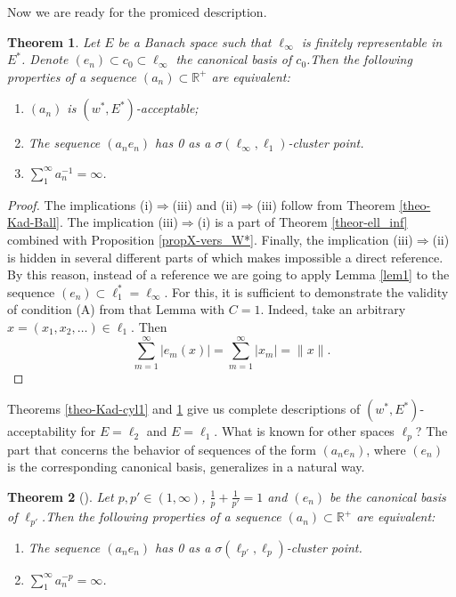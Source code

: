 \documentclass[11pt,twoside, reqno]{amsart}
\theoremstyle{plain}
\newtheorem{theorem}{Theorem}[section]
\theoremstyle{remark}
\theoremstyle{definition}
\numberwithin{equation}{section}
\begin{document}
Now we are ready for the promiced description.
\begin{theorem}  \label{theorE*=ell_inf}
Let $E$ be a Banach space such that $\ell_\infty$ is finitely
representable in $E^*$. Denote $(e_n) \subset c_0 \subset \ell_\infty$ the canonical basis of $c_0$.Then the following properties of a sequence $(a_n) \subset {\mathbb{R}}^+$ are equivalent:

\begin{enumerate}
\item[(i)] $(a_n)$ is $(w^*, E^*)$-acceptable;

\item[(ii)] The sequence $(a_n e_n)$ has 0 as a $\sigma(\ell_\infty, \ell_1)$-cluster point.

\item[(iii)] $\sum_1^\infty a_n^{-1}=\infty$.
\end{enumerate}
\end{theorem}

\begin{proof}
The implications (i)$\Longrightarrow$(iii) and (ii)$\Longrightarrow$(iii) follow from Theorem \ref{theo-Kad-Ball}. The implication (iii)$\Longrightarrow$(i) is a part of Theorem \ref{theor-ell_inf} combined with Proposition \ref{propX-vers_W*}. Finally, the implication (iii)$\Longrightarrow$(ii) is hidden in several different parts of \cite{Kad-cyl} which makes impossible a direct reference. By this reason, instead of a reference we are going to apply Lemma \ref{lem1} to the sequence  $(e_n) \subset \ell_1^* = \ell_\infty$. For this, it is sufficient to demonstrate the validity of condition (A) from that Lemma with $C=1$. Indeed, take an arbitrary $x=(x_1, x_2, \ldots) \in \ell_1$. Then
$$
\sum_{m=1}^\infty \left|e_m(x) \right| = \sum_{m=1}^\infty \left|x_m\right| = \|x\|.
$$
\end{proof}

Theorems \ref{theo-Kad-cyl1} and \ref{theorE*=ell_inf} give us complete descriptions of $(w^*, E^*)$-acceptability for $E = \ell_2$ and  $E = \ell_1$. What is known for other spaces $\ell_p$? The part that concerns the behavior of sequences of the form  $(a_n e_n)$, where  $(e_n)$ is the corresponding canonical basis, generalizes in a natural way.

\begin{theorem}[{\cite[Lemma 2.2]{Shkarin}}]  \label{theorE*=ell_p}
Let $p, p' \in (1, \infty)$, $\frac{1}{p}+\frac{1}{p'}=1$ and $(e_n)$ be the  canonical basis of $\ell_{p'}$.Then the following properties of a sequence $(a_n) \subset {\mathbb{R}}^+$ are equivalent:

\begin{enumerate}

\item[(A)] The sequence $(a_n e_n)$ has 0 as a $\sigma(\ell_{p'}, \ell_p)$-cluster point.

\item[(B)] $\sum_1^\infty a_n^{-p}=\infty$.
\end{enumerate}
\end{theorem}
\end{document}

